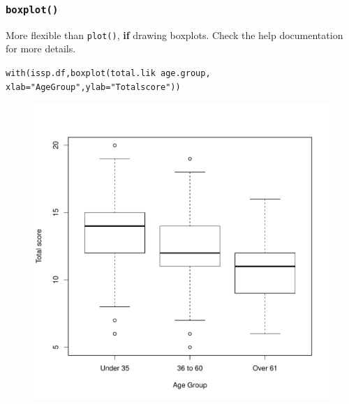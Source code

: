 \documentclass{beamer}\usepackage[]{graphicx}\usepackage[]{color}
\makeatletter
\newcommand{\hlstr}[1]{\textcolor[rgb]{0.667,0.267,0}{#1}}%
\newcommand{\hlopt}[1]{\textcolor[rgb]{0,0,0}{\textbf{#1}}}%
\newcommand{\hlstd}[1]{\textcolor[rgb]{0,0,0}{#1}}%
\newcommand{\hlkwc}[1]{\textcolor[rgb]{0,0,0.4}{#1}}%
\newcommand{\hlkwd}[1]{\textcolor[rgb]{0,0.267,0.4}{#1}}%
\newenvironment{kframe}{%
 \def\at@end@of@kframe{}%
 \ifinner\ifhmode%
  \def\at@end@of@kframe{\end{minipage}}%
  \begin{minipage}{\columnwidth}%
 \fi\fi%
 \def\FrameCommand##1{\hskip\@totalleftmargin \hskip-\fboxsep
 \colorbox{shadecolor}{##1}\hskip-\fboxsep
     \hskip-\linewidth \hskip-\@totalleftmargin \hskip\columnwidth}%
 \MakeFramed {\advance\hsize-\width
   \@totalleftmargin\z@ \linewidth\hsize
   \@setminipage}}%
 {\par\unskip\endMakeFramed%
 \at@end@of@kframe}
\newenvironment{knitrout}{}{} %
\makeatother
\begin{document}
\begin{frame}[fragile]
  \frametitle{\texttt{boxplot()}}
More flexible than \texttt{plot()}, \textbf{if} drawing boxplots. Check the help documentation for more details.
\begin{knitrout}
\color{fgcolor}\begin{kframe}
\begin{alltt}
\hlkwd{with}\hlstd{(issp.df,} \hlkwd{boxplot}\hlstd{(total.lik}\hlopt{~}\hlstd{age.group,}
   \hlkwc{xlab} \hlstd{=} \hlstr{"Age Group"}\hlstd{,} \hlkwc{ylab} \hlstd{=} \hlstr{"Total score"}\hlstd{))}
\end{alltt}
\end{kframe}
\end{knitrout}

\begin{figure}[h]
  \vspace{-20pt}
\centering
  \includegraphics[height = 0.5\textwidth, keepaspectratio]{Figure/box6}
 \label{fig:box6}
\end{figure}
\end{frame}
\end{document}
